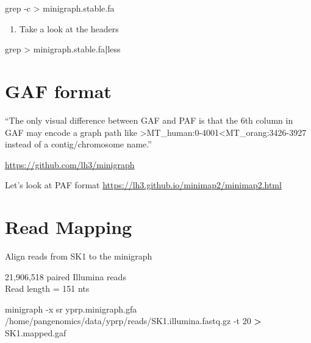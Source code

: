 \documentclass[
]{book}
\newenvironment{Shaded}{\begin{snugshade}}{\end{snugshade}}
\newcommand{\AttributeTok}[1]{\textcolor[rgb]{0.77,0.63,0.00}{#1}}
\newcommand{\ExtensionTok}[1]{#1}
\newcommand{\FunctionTok}[1]{\textcolor[rgb]{0.00,0.00,0.00}{#1}}
\newcommand{\KeywordTok}[1]{\textcolor[rgb]{0.13,0.29,0.53}{\textbf{#1}}}
\newcommand{\NormalTok}[1]{#1}
\newcommand{\OperatorTok}[1]{\textcolor[rgb]{0.81,0.36,0.00}{\textbf{#1}}}
\newcommand{\StringTok}[1]{\textcolor[rgb]{0.31,0.60,0.02}{#1}}
\providecommand{\tightlist}{%
  \setlength{\itemsep}{0pt}\setlength{\parskip}{0pt}}
\begin{document}
\begin{Shaded}
\begin{Highlighting}[]
\FunctionTok{grep} \AttributeTok{{-}c} \StringTok{\textquotesingle{}\textgreater{}\textquotesingle{}}\NormalTok{ minigraph.stable.fa}
\end{Highlighting}
\end{Shaded}

\begin{enumerate}
\def\labelenumi{\arabic{enumi}.}
\setcounter{enumi}{1}
\tightlist
\item
  Take a look at the headers
\end{enumerate}

\begin{Shaded}
\begin{Highlighting}[]
\FunctionTok{grep} \StringTok{\textquotesingle{}\textgreater{}\textquotesingle{}}\NormalTok{ minigraph.stable.fa}\KeywordTok{|}\FunctionTok{less}
\end{Highlighting}
\end{Shaded}

\hypertarget{gaf-format}{%
\section{GAF format}\label{gaf-format}}

``The only visual difference between GAF and PAF is that the 6th column in GAF may encode a graph path like \textgreater MT\_human:0-4001\textless MT\_orang:3426-3927 instead of a contig/chromosome name.''

\url{https://github.com/lh3/minigraph}

Let's look at PAF format
\url{https://lh3.github.io/minimap2/minimap2.html}

\hypertarget{read-mapping}{%
\section{Read Mapping}\label{read-mapping}}

Align reads from SK1 to the minigraph

21,906,518 paired Illumina reads\\
Read length = 151 nts

\begin{Shaded}
\begin{Highlighting}[]
\ExtensionTok{minigraph} \AttributeTok{{-}x}\NormalTok{ sr yprp.minigraph.gfa /home/pangenomics/data/yprp/reads/SK1.illumina.fastq.gz }\AttributeTok{{-}t}\NormalTok{ 20 }\OperatorTok{\textgreater{}}\NormalTok{ SK1.mapped.gaf}
\end{Highlighting}
\end{Shaded}
\end{document}
